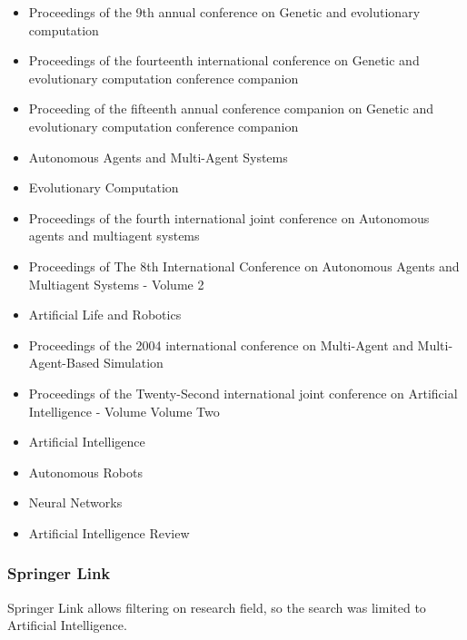 \documentclass[a4paper]{book}
\begin{document}
\begin{appendices}
\begin{itemize}
				\item{Proceedings of the 9th annual conference on Genetic and evolutionary computation}
				\item{Proceedings of the fourteenth international conference on Genetic and evolutionary computation conference companion}
				\item{Proceeding of the fifteenth annual conference companion on Genetic and evolutionary computation conference companion}
				\item{Autonomous Agents and Multi-Agent Systems}
				\item{Evolutionary Computation}
				\item{Proceedings of the fourth international joint conference on Autonomous agents and multiagent systems}
				\item{Proceedings of The 8th International Conference on Autonomous Agents and Multiagent Systems - Volume 2 }
				\item{Artificial Life and Robotics}
				\item{Proceedings of the 2004 international conference on Multi-Agent and Multi-Agent-Based Simulation }
				\item{Proceedings of the Twenty-Second international joint conference on Artificial Intelligence - Volume Volume Two}
				\item{Artificial Intelligence}
				\item{Autonomous Robots}
				\item{Neural Networks}
				\item{Artificial Intelligence Review }
				\end{itemize}

				\subsubsection{Springer Link}Springer Link allows filtering on research field, so the search was limited to Artificial Intelligence.



\end{appendices}
\end{document}
